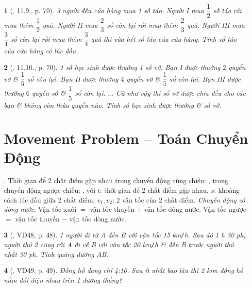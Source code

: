 \documentclass{article}
\newtheorem{baitoan}{}
\begin{document}
\begin{baitoan}[\cite{TLCT_THCS_Toan_6_so_hoc}, 11.9., p. 70]
	3 người đến cửa hàng mua 1 số táo. Người I mua $\dfrac{1}{2}$ số táo rồi mua thêm $\dfrac{1}{2}$ quả. Người II mua $\dfrac{2}{3}$ số còn lại rồi mua thêm $\dfrac{2}{3}$ quả. Người III mua $\dfrac{3}{4}$ số còn lại rồi mua thêm $\dfrac{3}{4}$ quả thì vừa hết số táo của cửa hàng. Tính số táo của cửa hàng có lúc đầu.
\end{baitoan}

\begin{baitoan}[\cite{TLCT_THCS_Toan_6_so_hoc}, 11.10., p. 70]
	1 số học sinh được thưởng 1 số vở. Bạn I được thưởng $2$ quyển vở \& $\dfrac{1}{5}$ số còn lại. Bạn II được thưởng $4$ quyển vở \& $\dfrac{1}{5}$ số còn lại. Bạn III được thưởng $6$ quyển vở \& $\dfrac{1}{5}$ số còn lại. $\ldots$ Cứ như vậy thì số vở được chia đều cho các bạn \& không còn thừa quyển nào. Tính số học sinh được thưởng \& số vở.
\end{baitoan}


\section{Movement Problem -- Toán Chuyển Động}
 .  Thời gian để 2 chất điểm gặp nhau trong chuyển động cùng chiều: , trong chuyển động ngược chiều: , với $t$: thời gian để 2 chất điểm gặp nhau, $s$: khoảng cách lúc đầu giữa 2 chất điểm, $v_1,v_2$: 2 vận tốc của 2 chất điểm.  \textit{Chuyển động có dòng nước}: Vận tốc xuôi $=$ vận tốc thuyền $+$ vận tốc dòng nước. Vận tốc ngược $=$ vận tốc thuyền $-$ vận tốc dòng nước.

\begin{baitoan}[\cite{Binh_Toan_6_tap_2}, VD48, p. 48]
	1 người đi từ A đến B với vận tốc {\rm15 km{\tt/}h}. Sau đó {\rm1 h 30 ph}, người thứ 2 cũng rời A đi về B với vận tốc {\rm20 km{\tt/}h} \& đến B trước người thứ nhất {\rm30 ph}. Tính quãng đường AB.
\end{baitoan}

\begin{baitoan}[\cite{Binh_Toan_6_tap_2}, VD49, p. 49]
	Đồng hồ đang chỉ {\rm4:10}. Sau ít nhất bao lâu thì 2 kim đồng hồ nằm đối diện nhau trên 1 đường thẳng?
\end{baitoan}
\end{document}
